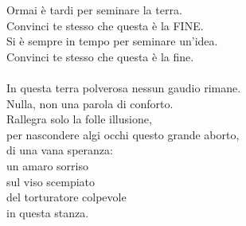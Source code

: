 {  Ormai è tardi per seminare la terra.\\
  Convinci te stesso che questa è la FINE.\\
  Si è sempre in tempo per seminare un'idea.\\
  Convinci te stesso che questa è la fine.\\
  \\
  In questa terra polverosa nessun gaudio rimane.\\
  Nulla, non una parola di conforto.\\
  Rallegra solo la folle illusione,\\
  per nascondere algi occhi questo grande aborto,\\
  di una vana speranza:\\
  un amaro sorriso\\
  sul viso scempiato\\
  del torturatore colpevole\\
  in questa stanza.\\
}
